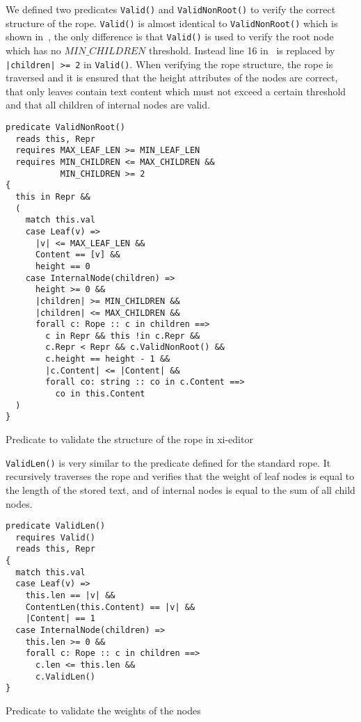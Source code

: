 We defined two predicates \texttt{Valid()} and \texttt{ValidNonRoot()} to verify the correct structure of the rope.
\texttt{Valid()} is almost identical to \texttt{ValidNonRoot()} which is shown in~, the only difference is that \texttt{Valid()} is used to verify the root node which has no $MIN\_CHILDREN$ threshold.
Instead line 16 in~ is replaced by \texttt{|children| >= 2} in \texttt{Valid()}.
When verifying the rope structure, the rope is traversed and it is ensured that the height attributes of the nodes are correct, that only leaves contain text content which must not exceed a certain threshold and that all children of internal nodes are valid.


\begin{listing}[h!]
\begin{verbatim}
predicate ValidNonRoot()
  reads this, Repr
  requires MAX_LEAF_LEN >= MIN_LEAF_LEN
  requires MIN_CHILDREN <= MAX_CHILDREN && 
           MIN_CHILDREN >= 2
{
  this in Repr &&
  (
    match this.val
    case Leaf(v) => 
      |v| <= MAX_LEAF_LEN && 
      Content == [v] && 
      height == 0
    case InternalNode(children) =>
      height >= 0 &&
      |children| >= MIN_CHILDREN &&
      |children| <= MAX_CHILDREN &&
      forall c: Rope :: c in children ==>
        c in Repr && this !in c.Repr && 
        c.Repr < Repr && c.ValidNonRoot() &&
        c.height == height - 1 && 
        |c.Content| <= |Content| &&
        forall co: string :: co in c.Content ==> 
          co in this.Content
  )
}
\end{verbatim}
    \caption{Predicate to validate the structure of the rope in xi-editor}
    \label{lst:xi-rope-valid}
\end{listing}

\texttt{ValidLen()} is very similar to the predicate defined for the standard rope.
It recursively traverses the rope and verifies that the weight of leaf nodes is equal to the length of the stored text, and of internal nodes is equal to the sum of all child nodes.

\begin{listing}[h!]
\begin{verbatim}
predicate ValidLen()
  requires Valid()
  reads this, Repr
{
  match this.val
  case Leaf(v) => 
    this.len == |v| && 
    ContentLen(this.Content) == |v| && 
    |Content| == 1
  case InternalNode(children) => 
    this.len >= 0 && 
    forall c: Rope :: c in children ==> 
      c.len <= this.len &&
      c.ValidLen()
}
\end{verbatim}
    \caption{Predicate to validate the weights of the nodes}
    \label{lst:xi-rope-valid-len}
\end{listing}

